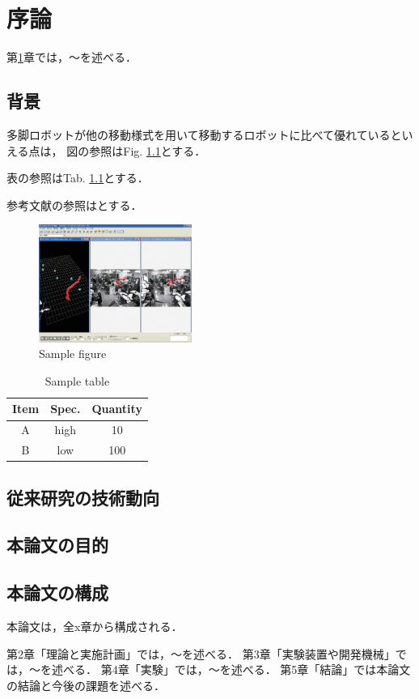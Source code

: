 ﻿%

\chapter{序論}\label{chapter:序論}
第\ref{chapter:序論}章では，～を述べる．


\section{背景}
多脚ロボットが他の移動様式を用いて移動するロボットに比べて優れているといえる点は，
図の参照はFig. \ref{fig:sample}とする．

表の参照はTab. \ref{table:sample}とする．

参考文献の参照は\cite{実用的4足歩行機械}とする．

\begin{figure}[tbp]
  \begin{center}
    \includegraphics[width=50mm, clip]{figure1/sample.eps}
    \caption{Sample figure}
    \label{fig:sample}
  \end{center}
\end{figure}

\begin{table}[tbp]
    \caption{Sample table}
    \label{table:sample}
    \begin{center}
        \begin{tabular} {|c|c|c|}
        \hline
        Item & Spec. & Quantity  \\
        \hline\hline
        A & high & 10 \\
        \hline
        B & low & 100 \\
        \hline
        \end{tabular}
    \end{center}
\end{table}


\section{従来研究の技術動向}

\section{本論文の目的}

\section{本論文の構成}
本論文は，全x章から構成される．

第2章「理論と実施計画」では，～を述べる．
第3章「実験装置や開発機械」では，～を述べる．
第4章「実験」では，～を述べる．
第5章「結論」では本論文の結論と今後の課題を述べる．




